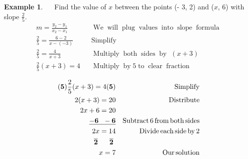 \documentclass[12pt]{book}
\theoremstyle{definition}
\newtheorem{example}{Example}
\newcommand{\tmop}[1]{\ensuremath{\operatorname{#1}}}
\begin{document}
\begin{example}\label{Lin54}~~
Find the value of $x$ between the points (- 3, 2) and ($x$, 6) with slope $\displaystyle\frac{2}{5}$.\\
  \begin{eqnarray*}
    m = \frac{y_2 - y_1}{x_2 - x_1} &  & \tmop{We} \tmop{will} \tmop{plug}
    \tmop{values} \tmop{into} \tmop{slope} \tmop{formula}\\
    \frac{2}{5} = \frac{6 - 2}{x - (- 3)} &  & \tmop{Simplify}\\
    \frac{2}{5} = \frac{4}{x + 3} &  & \tmop{Multiply} \tmop{both}
    \tmop{sides} \tmop{by~} (x + 3) \\
    \frac{2}{5} (x + 3) = 4 &  & \tmop{Multiply} \tmop{by} 5 \tmop{to}
    \tmop{clear} \tmop{fraction}\\
  \end{eqnarray*}
  \begin{eqnarray*}
    {\bf(5)} \frac{2}{5} (x + 3) = 4 {\bf(5)} &  & \tmop{Simplify}\\
    2 (x + 3) = 20 &  & \tmop{Distribute}\\
    2 x + 6 = 20 &  &  \\
    \bf{\underline{- 6 ~~- 6}} &  & \tmop{Subtract} 6 \tmop{from} \tmop{both}
    \tmop{sides}\\
    2 x = 14 &  & \tmop{Divide} \tmop{each} \tmop{side} \tmop{by} 2\\
    \bf{\overline{2} ~~~~~ \overline{2}}~ &  & \\
    x = 7 &  & \tmop{Our} \tmop{solution}
  \end{eqnarray*}
\end{example}
\end{document}
